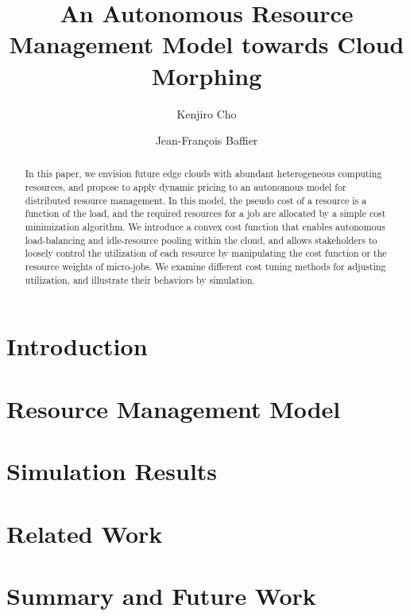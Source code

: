 \documentclass[10pt,sigconf,letterpaper,nonacm]{acmart}
\title{An Autonomous Resource Management Model towards Cloud Morphing}
\author{Kenjiro Cho}
\affiliation{\institution{IIJ Research Laboratory}\city{}\country{}}
\author{Jean-François Baffier}
\affiliation{\institution{IIJ Research Laboratory}\city{}\country{}}
\begin{document}
\begin{abstract}

    In this paper, we envision future edge clouds with
    abundant heterogeneous computing resources,
    and propose to apply dynamic pricing to an autonomous model for
    distributed resource management.
    In this model, the pseudo cost of a resource is a function of the
    load, and the required resources for a job are allocated by a simple
    cost minimization algorithm.
    We introduce a convex cost function that enables autonomous
    load-balancing and idle-resource pooling within the cloud, and allows
    stakeholders to loosely control the utilization of each resource by
    manipulating the cost function or the resource weights of micro-jobs.
    We examine different cost tuning methods for adjusting
    utilization, and illustrate their behaviors by simulation.

\end{abstract}

\maketitle

\section{Introduction}



\section{Resource Management Model}



\section{Simulation Results}



\section{Related Work}



\section{Summary and Future Work}





\end{document}

